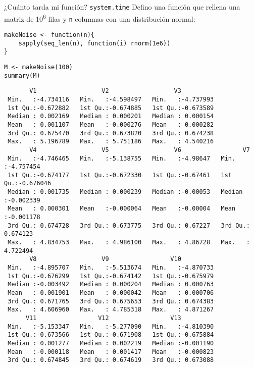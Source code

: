 \documentclass[xcolor={usenames,svgnames,dvipsnames}]{beamer}
\begin{document}
\begin{frame}[label={sec:org4570aee},fragile]{¿Cuánto tarda mi función? \texttt{system.time}}
 Defino una función que rellena una matriz de 10\textsuperscript{6} filas y \texttt{n} columnas con una distribución normal:
\lstset{language=r,label= ,caption= ,captionpos=b,numbers=none}
\begin{lstlisting}
makeNoise <- function(n){
    sapply(seq_len(n), function(i) rnorm(1e6))
}
\end{lstlisting}

\lstset{language=r,label= ,caption= ,captionpos=b,numbers=none}
\begin{lstlisting}
M <- makeNoise(100)
summary(M)
\end{lstlisting}

\begin{verbatim}
       V1                  V2                  V3           
 Min.   :-4.734116   Min.   :-4.598497   Min.   :-4.737993  
 1st Qu.:-0.672882   1st Qu.:-0.674885   1st Qu.:-0.673589  
 Median : 0.002169   Median : 0.000201   Median : 0.000154  
 Mean   : 0.001107   Mean   :-0.000276   Mean   : 0.000282  
 3rd Qu.: 0.675470   3rd Qu.: 0.673820   3rd Qu.: 0.674238  
 Max.   : 5.196789   Max.   : 5.751186   Max.   : 4.540216  
       V4                  V5                  V6                 V7           
 Min.   :-4.746465   Min.   :-5.138755   Min.   :-4.98647   Min.   :-4.757454  
 1st Qu.:-0.674177   1st Qu.:-0.672330   1st Qu.:-0.67461   1st Qu.:-0.676046  
 Median : 0.001735   Median : 0.000239   Median :-0.00053   Median :-0.002339  
 Mean   : 0.000301   Mean   :-0.000064   Mean   :-0.00004   Mean   :-0.001178  
 3rd Qu.: 0.674728   3rd Qu.: 0.673775   3rd Qu.: 0.67227   3rd Qu.: 0.674123  
 Max.   : 4.834753   Max.   : 4.986100   Max.   : 4.86728   Max.   : 4.722494  
       V8                  V9                 V10           
 Min.   :-4.895707   Min.   :-5.513674   Min.   :-4.870733  
 1st Qu.:-0.676299   1st Qu.:-0.674142   1st Qu.:-0.675979  
 Median :-0.003492   Median : 0.000204   Median : 0.000763  
 Mean   :-0.001901   Mean   : 0.000042   Mean   :-0.000706  
 3rd Qu.: 0.671765   3rd Qu.: 0.675653   3rd Qu.: 0.674383  
 Max.   : 4.606960   Max.   : 4.785318   Max.   : 4.871267  
      V11                 V12                 V13           
 Min.   :-5.153347   Min.   :-5.277090   Min.   :-4.810390  
 1st Qu.:-0.673566   1st Qu.:-0.671908   1st Qu.:-0.675884  
 Median : 0.001277   Median : 0.002219   Median :-0.001190  
 Mean   :-0.000118   Mean   : 0.001417   Mean   :-0.000823  
 3rd Qu.: 0.674845   3rd Qu.: 0.674619   3rd Qu.: 0.673088  

\end{verbatim}
\end{frame}
\end{document}
